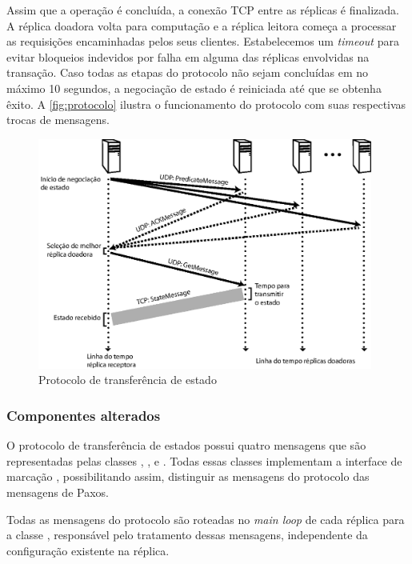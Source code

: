 Assim que a operação é concluída, a conexão TCP entre as réplicas é finalizada. A réplica
doadora volta para computação e a réplica leitora começa a processar as requisições
encaminhadas pelos seus clientes. Estabelecemos um \emph{timeout} para evitar bloqueios
indevidos por falha em alguma das réplicas envolvidas na transação. Caso todas as etapas
do protocolo não sejam concluídas em no máximo 10 segundos, a negociação de estado é
reiniciada até que se obtenha êxito. A \autoref{fig:protocolo} ilustra o funcionamento do
protocolo com suas respectivas trocas de mensagens.

\begin{figure}[ht]
  \centering
  \includegraphics[width=11cm]{conteudo/capitulos/figuras/transferencia_estado.eps}
  \caption{Protocolo de transferência de estado}
  \label{fig:protocolo}
\end{figure}

\subsubsection{Componentes alterados}

O protocolo de transferência de estados possui quatro mensagens que são representadas
pelas classes , ,  e
. Todas essas classes implementam a interface de marcação
, possibilitando assim, distinguir as mensagens do
protocolo das mensagens de Paxos.

Todas as mensagens do protocolo são roteadas no \emph{main loop} de cada réplica para a
classe , responsável pelo tratamento dessas mensagens, independente da
configuração existente na réplica.


